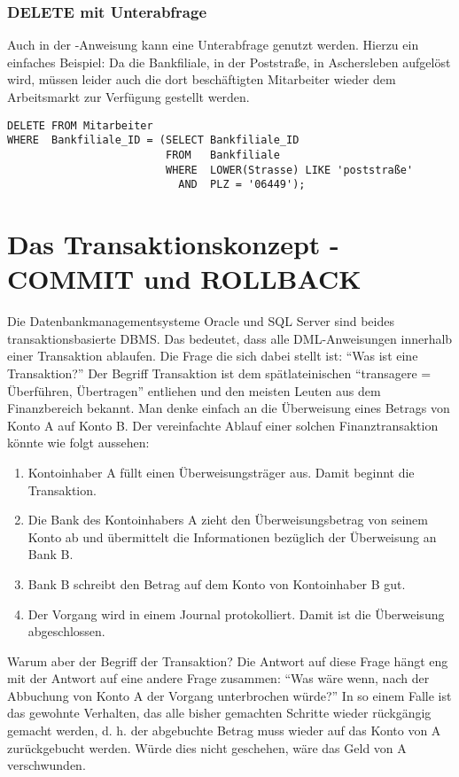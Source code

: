         \subsubsection{DELETE mit Unterabfrage}
         Auch in der \DELETE-Anweisung kann eine Unterabfrage genutzt werden.
         Hierzu ein einfaches Beispiel: Da die Bankfiliale, in der
         Poststra\ss{}e, in Aschersleben aufgel\"ost wird, m\"ussen leider auch
         die dort besch\"aftigten Mitarbeiter wieder dem Arbeitsmarkt zur
         Verf\"ugung gestellt werden.
          \begin{lstlisting}[language=oracle_sql,caption={\DELETE{} mit Unterabfrage},label=sql07_22]
DELETE FROM Mitarbeiter
WHERE  Bankfiliale_ID = (SELECT Bankfiliale_ID
                         FROM   Bankfiliale
                         WHERE  LOWER(Strasse) LIKE 'poststraße'
                           AND  PLZ = '06449');
          \end{lstlisting}
    \section{Das Transaktionskonzept - COMMIT und ROLLBACK}
      Die Datenbankmanagementsysteme Oracle und SQL Server sind beides
      transaktionsbasierte DBMS. Das bedeutet, dass alle DML-Anweisungen
      innerhalb einer Transaktion ablaufen. Die Frage die sich dabei stellt ist:
      \enquote{Was ist eine Transaktion?} Der Begriff Transaktion ist dem
      sp\"atlateinischen \enquote{transagere = \"Uberf\"uhren, \"Ubertragen}
      entliehen und den meisten Leuten aus dem Finanzbereich bekannt. Man denke
      einfach an die \"Uberweisung eines Betrags von Konto A auf Konto B. Der
      vereinfachte Ablauf einer solchen Finanztransaktion k\"onnte wie folgt
      aussehen:
      \begin{enumerate}
        \item Kontoinhaber A f\"ullt einen \"Uberweisungstr\"ager aus. Damit
        beginnt die Transaktion.
        \item Die Bank des Kontoinhabers A zieht den \"Uberweisungsbetrag von
        seinem Konto ab und \"ubermittelt die Informationen bez\"uglich der
        \"Uberweisung an Bank B.
        \item Bank B schreibt den Betrag auf dem Konto von Kontoinhaber B gut.
        \item Der Vorgang wird in einem Journal protokolliert. Damit ist die
        \"Uberweisung abgeschlossen.
      \end{enumerate}
      Warum aber der Begriff der Transaktion? Die Antwort auf diese Frage
      h\"angt eng mit der Antwort auf eine andere Frage zusammen: \enquote{Was
      w\"are wenn, nach der Abbuchung von Konto A der Vorgang unterbrochen
      w\"urde?} In so einem Falle ist das gewohnte Verhalten, das alle bisher
      gemachten Schritte wieder r\"uckg\"angig gemacht werden, d. h. der
      abgebuchte Betrag muss wieder auf das Konto von A zur\"uckgebucht werden.
      W\"urde dies nicht geschehen, w\"are das Geld von A verschwunden.

